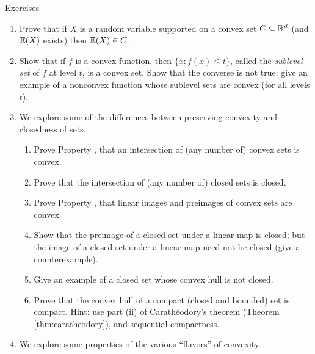\begin{xcb}{Exercises}
\begin{enumerate}[label=\thechapter.\arabic*]
\settowidth{\leftmargini}{0.00.\hskip\labelsep}
\item Prove that if $X$ is a random variable supported on a convex set $C
  \subseteq \mathbb{R}^d$ (and $\mathbb{E}(X)$ exists) then $\mathbb{E}(X) \in C$.  

\item \label{ex:convex_sublevel}
  Show that if $f$ is a convex function, then $\{x : f(x) \leq t \}$, called the
  \emph{sublevel set} of $f$ at level $t$, is a convex set. Show that the
  converse is not true: give an example of a nonconvex function whose sublevel
  sets are convex (for all levels $t$).

\item \label{ex:convex_closed}
  We explore some of the differences between preserving convexity and closedness
  of sets. 

\begin{enumerate}[label=\alph*.]
\item Prove Property , that an intersection of
  (any number of) convex sets is convex.

\item Prove that the intersection of (any number of) closed sets is closed.

\item Prove Property , that linear images and preimages
  of convex sets are convex. 

\item Show that the preimage of a closed set under a linear map is closed; but
  the image of a closed set under a linear map need not be closed (give a
  counterexample). 

\item Give an example of a closed set whose convex hull is not closed. 
  
\item Prove that the convex hull of a compact (closed and bounded) set is
  compact. Hint: use part (ii) of Carath\'{e}odory's theorem (Theorem
  \ref{thm:caratheodory}), and sequential compactness.   
\end{enumerate}

\item \label{ex:convex_flavors}
  We explore some properties of the various ``flavors'' of convexity.   


\end{enumerate}
\end{xcb}
